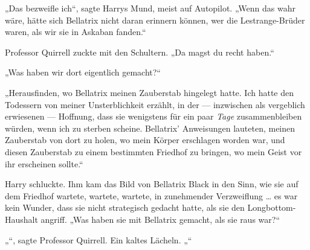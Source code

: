 „Das bezweifle ich“, sagte Harrys Mund, meist auf Autopilot.
„Wenn das wahr wäre, hätte sich Bellatrix nicht daran erinnern können, wer die Lestrange-Brüder waren, als wir sie in Askaban fanden.“

Professor Quirrell zuckte mit den Schultern.
„Da magst du recht haben.“

„Was haben wir dort eigentlich gemacht?“

„Herausfinden, wo Bellatrix meinen Zauberstab hingelegt hatte. Ich hatte den Todessern von meiner Unsterblichkeit erzählt, in der — inzwischen als vergeblich erwiesenen — Hoffnung, dass sie wenigstens für ein paar \emph{Tage} zusammenbleiben würden, wenn ich zu sterben scheine. Bellatrix’ Anweisungen lauteten, meinen Zauberstab von dort zu holen, wo mein Körper erschlagen worden war, und diesen Zauberstab zu einem bestimmten Friedhof zu bringen, wo mein Geist vor ihr erscheinen sollte.“

Harry schluckte. Ihm kam das Bild von Bellatrix Black in den Sinn, wie sie auf dem Friedhof wartete, wartete, wartete, in zunehmender Verzweiflung … es war kein Wunder, dass sie nicht strategisch gedacht hatte, als sie den Longbottom-Haushalt angriff.
„Was haben sie mit Bellatrix gemacht, als sie raus war?“

„“, sagte Professor Quirrell. Ein kaltes Lächeln. „“

